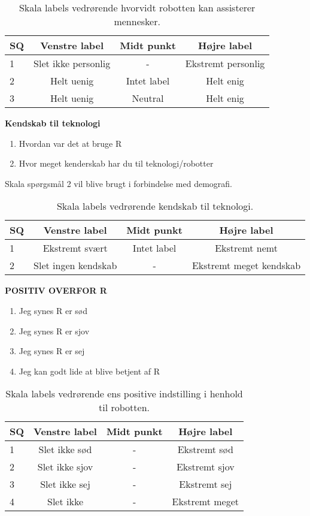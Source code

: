 %
\begin{table}[H]
	\centering
	\begin{tabular}{l|c|c|c}
		SQ     & Venstre label & Midt punkt & Højre label \\\hline
		1   & Slet ikke personlig & - & Ekstremt personlig          \\\hline
		2   & Helt uenig & Intet label & Helt enig   \\\hline
		3   & Helt uenig & Neutral & Helt enig  \\\hline
	\end{tabular}
\caption{Skala labels vedrørende hvorvidt robotten kan assisterer mennesker.}
	\label{tab:AssistererMennesker}
\end{table}
\noindent
%
\textbf{Kendskab til teknologi}\\
%
\begin{enumerate}
  \item Hvordan var det at bruge R
  \item Hvor meget kenderskab har du til teknologi/robotter
\end{enumerate}
%
Skala spørgsmål 2 vil blive brugt i forbindelse med demografi.
%
\begin{table}[H]
	\centering 
	\begin{tabular}{l|c|c|c}
		SQ     & Venstre label & Midt punkt & Højre label \\\hline
		1   & Ekstremt svært & Intet label & Ekstremt nemt          \\\hline
		2   & Slet ingen kendskab & - & Ekstremt meget kendskab 
	\end{tabular}
\caption{Skala labels vedrørende kendskab til teknologi.}
	\label{tab:KendskabTilTek}
\end{table}
\noindent
%
\textbf{POSITIV OVERFOR R}\\
%
\begin{enumerate}
  \item Jeg synes R er sød
  \item Jeg synes R er sjov
  \item Jeg synes R er sej
  \item Jeg kan godt lide at blive betjent af R
\end{enumerate}
%
\begin{table}[H]
	\centering
	\begin{tabular}{l|c|c|c}
		SQ     & Venstre label & Midt punkt & Højre label \\\hline
		1   & Slet ikke sød & - & Ekstremt sød      \\\hline
		2   & Slet ikke sjov & - & Ekstremt sjov \\\hline
		3   & Slet ikke sej & - & Ekstremt sej \\\hline
		4   & Slet ikke & - & Ekstremt meget
	\end{tabular}
\caption{Skala labels vedrørende ens positive indstilling i henhold til robotten.}
\label{tab:PositivR} 
\end{table}
\noindent
%





